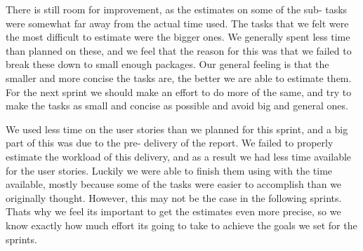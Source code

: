 There is still room for improvement, as the estimates on some of the sub- tasks were somewhat far away from the actual time used. The tasks that we felt were the most difficult to estimate were the bigger ones. We generally spent less time than planned on these, and we feel that the reason for this was that we failed to break these down to small enough packages. Our general feeling is that the smaller and more concise the tasks are, the better we are able to estimate them. For the next sprint we should make an effort to do more of the same, and try to make the tasks as small and concise as possible and avoid big and general ones.

We used less time on the user stories than we planned for this sprint, and a big part of this was due to the pre- delivery of the report. We failed to properly estimate the workload of this delivery, and as a result we had less time available for the user stories. Luckily we were able to finish them using with the time available, mostly because some of the tasks were easier to accomplish than we originally thought. However, this may not be the case in the following sprints. Thats why we feel its important to get the estimates even more precise, so we know exactly how much effort its going to take to achieve the goals we set for the sprints. 

